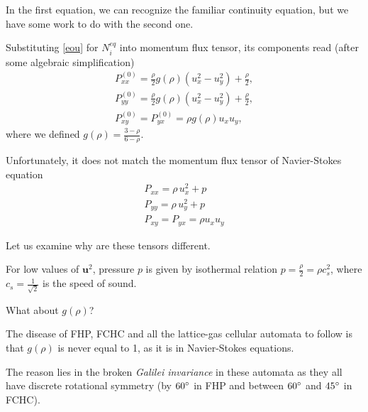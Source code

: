 In the first equation, we can recognize the familiar continuity equation, but we have some work to do with the second one.

Substituting \ref{eou} for $N_i^{eq}$ into momentum flux tensor, its components read (after some algebraic simplification)
\begin{equation} \label{FHPT}
\begin{split}
P_{xx}^{(0)} = \frac{\rho}{2}g(\rho)(u_x^2 - u_y^2) + \frac{\rho}{2},\\
P_{yy}^{(0)} = \frac{\rho}{2}g(\rho) (u_x^2 - u_y^2) + \frac{\rho}{2},\\
P_{xy}^{(0)} = P_{yx}^{(0)} = \rho g(\rho)u_xu_y,
\end{split}
\end{equation}
where we defined $g(\rho) =  \frac{3-\rho}{6 - \rho}$.

Unfortunately, it does not match the momentum flux tensor of Navier-Stokes equation
\begin{equation} \label{NST}
\begin{split}
P_{xx} = \rho \, u_x^2 + p\\
P_{yy} = \rho\, u_y^2 + p\\
P_{xy} = P_{yx} = \rho u_x u_y
\end{split}
\end{equation}

Let us examine why are these tensors different.

For low values of $\bm{u}^2$, pressure $p$ is given by isothermal relation $p = \frac{\rho}{2} = \rho c_s^2$, where $c_s = \frac{1}{\sqrt{2}}$ is the speed of sound\cite{wolf}.

What about $g(\rho)$?  

The disease of FHP, FCHC and all the lattice-gas cellular automata to follow is that $g(\rho)$ is never equal to 1, as it is in Navier-Stokes equations.

The reason lies in the broken \textit{Galilei invariance} in these automata as they all have discrete rotational symmetry (by $60 \degree$ in FHP and between $60 \degree$ and $45 \degree$ in FCHC).

